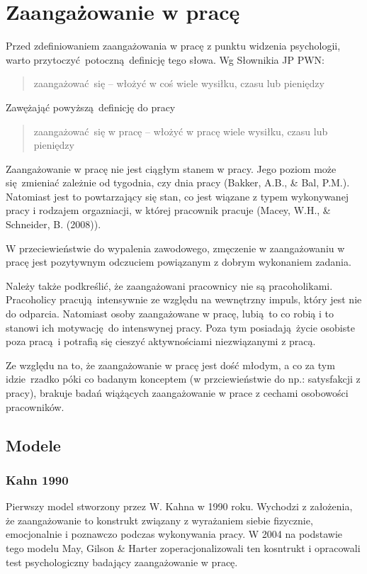 \section{Zaangażowanie w pracę}
Przed zdefiniowaniem zaangażowania w pracę z punktu widzenia psychologii, warto przytoczyć potoczną definicję tego słowa. Wg Słownikia JP PWN:
\begin{quote}
zaangażować się -- włożyć w coś wiele wysiłku, czasu lub pieniędzy
\end{quote}
Zawężająć powyższą definicję do pracy
\begin{quote}
zaangażować się w pracę -- włożyć w pracę wiele wysiłku, czasu lub pieniędzy
\end{quote}

Zaangażowanie w pracę nie jest ciągłym stanem w pracy. Jego poziom może się zmieniać zależnie od tygodnia, czy dnia pracy (Bakker, A.B., \& Bal, P.M.). Natomiast jest to powtarzający się stan, co jest wiązane z typem wykonywanej pracy i rodzajem orgazniacji, w której pracownik pracuje (Macey, W.H., \& Schneider, B. (2008)).

W przeciewieństwie do wypalenia zawodowego, zmęczenie w zaangażowaniu w pracę jest pozytywnym odczuciem powiązanym z dobrym wykonaniem zadania.

Należy także podkreślić, że zaangażowani pracownicy nie są pracoholikami. Pracoholicy pracują intensywnie ze względu na wewnętrzny impuls, który jest nie do odparcia. Natomiast osoby zaangażowane w pracę, lubią to co robią i to stanowi ich motywację do intenswynej pracy. Poza tym posiadają życie osobiste poza pracą i potrafią się cieszyć aktywnościami niezwiązanymi z pracą.

Ze względu na to, że zaangażowanie w pracę jest dość młodym, a co za tym idzie rzadko póki co badanym konceptem (w przciewieństwie do np.: satysfakcji z pracy), brakuje badań wiążących zaangażowanie w prace z cechami osobowości pracowników.
\subsection{Modele}
\subsubsection{Kahn 1990}
Pierwszy model stworzony przez W. Kahna w 1990  roku. Wychodzi z założenia, że zaangażowanie to konstrukt związany z wyrażaniem siebie fizycznie, emocjonalnie i poznawczo podczas wykonywania pracy. W 2004 na podstawie tego modelu May, Gilson \& Harter zoperacjonalizowali ten kosntrukt i opracowali test psychologiczny badający zaangażowanie w pracę.

